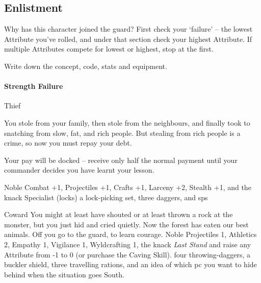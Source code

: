 \begin{multicols}{2}

\subsection{Enlistment}
\label{enlistment}

Why has this character joined the \gls{guard}?
First check your `failure' -- the lowest Attribute you've rolled, and under that section check your highest Attribute.
If multiple Attributes compete for lowest or highest, stop at the first.

Write down the concept, code, stats and equipment.

\begin{figure*}[b!]
  \label{commonWeapons}
  \commonWeaponsChart %
  \commonArmourChart
\end{figure*}

\paragraph{Strength Failure}

\begin{itemize}

    {Thief}%
    {
      You stole from your family, then stole from the neighbours, and finally took to snatching from slow, fat, and rich people.
      But stealing from rich people is a crime, so now you must repay your debt.

      Your pay will be docked -- receive only half the normal payment until your commander decides you have learnt your lesson.

    }%
    {Noble}%
    {Combat +1, Projectiles +1, Crafts +1, Larceny +2, Stealth +1, and the knack Specialist (locks)}%
    {a lock-picking set, three daggers, and  \glspl{sp}}%

    {Coward}%
    {
      You might at least have shouted or at least thrown a rock at the monster, but you just hid and cried quietly.
      Now the forest has eaten our best animals.
      Off you go to the \gls{guard}, to learn courage.
    }%
    {Noble}%
    {
      Projectiles 1, Athletics 2, Empathy 1, Vigilance 1, Wyldcrafting 1, the knack \textit{Last Stand} and raise any Attribute from -1 to 0 (or purchase the Caving Skill).
    }%
    {
      four throwing-daggers, a buckler shield, three travelling rations, and an idea of which \gls{pc} you want to hide behind when the situation goes South.
    }%



\end{itemize}
\end{multicols}
